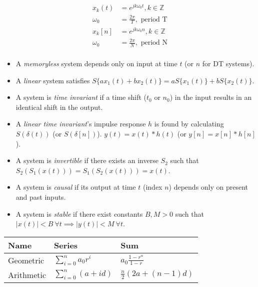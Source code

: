 \documentclass[8pt]{article}
\begin{document}
\begin{align*}
    x_k(t)   & = e^{jk\omega_0 t}, k \in \mathbb{Z} \\
    \omega_0 & = \frac{2\pi}{T}, \text{ period T}   \\
    x_k[n]   & = e^{jk\omega_0 n}, k \in \mathbb{Z} \\
    \omega_0 & = \frac{2\pi}{N}, \text{ period N}   \\
\end{align*}

\begin{itemize}
    \item A \emph{memoryless} system depends only on input at time
          \( t \) (or \( n \) for DT systems).
    \item A \emph{linear} system satisfies
          \(S\{a x_1(t) + b x_2(t)\} = a S\{x_1(t)\} + b S\{x_2(t)\}.\)
    \item A system is \emph{time invariant} if a time shift (\(t_0\) or \(n_0\)) in the input results in
          an identical shift in the output.
    \item A \emph{linear time invariant}'s impulse response \(h\) is found by calculating
          \(S(\delta(t))\) (or \(S(\delta[n])\)). \(y(t) = x(t) * h(t)\) (or \(y[n] = x[n] * h[n]\)).
    \item A system is \emph{invertible} if there exists
          an inverse \( S_2 \) such that
          \(S_2(S_1(x(t))) = S_1(S_2(x(t))) = x(t)\).
    \item A system is \emph{causal} if its output at time \( t \) (index \(n\)) depends
          only on present and past inputs.
    \item A system is \emph{stable} if there exist constants \( B, M > 0 \)
          such that
          \(|x(t)| < B \ \forall t \implies |y(t)| < M \ \forall t\).
\end{itemize}

\begin{table}[]
    \begin{tabular}{l|l|l}
        Name       & Series                   & Sum                           \\
        \hline
        Geometric  & $\sum_{i=0}^{n} a_0 r^i$ & $a_0 \frac{1 - r^n}{1 - r}$   \\
        \hline
        Arithmetic & $\sum_{i=0}^{n} (a+id)$  & $\frac{n}{2} (2a + (n - 1)d)$
    \end{tabular}
\end{table}
\end{document}
